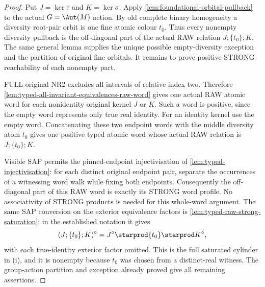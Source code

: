 \begin{proof}
Put $J=\ker\tau$ and $K=\ker\sigma$. Apply
\cref{lem:foundational-orbital-pullback} to the actual
$G=\Aut(M)$ action. By old complete binary homogeneity a diversity
root-pair orbit is one fine atomic colour $t_0$. Thus every nonempty
diversity pullback is the off-diagonal part of the actual RAW relation
$J;\{t_0\};K$. The same general lemma supplies the unique possible
empty-diversity exception and the partition of original fine orbitals.
It remains to prove positive STRONG reachability of each nonempty part.

FULL original NR2 excludes all intervals of relative index two.
Therefore \cref{lem:typed-all-invariant-equivalences-raw-word}
gives one actual RAW atomic word for each nonidentity original kernel
$J$ or $K$. Such a word is positive, since the empty word represents
only true real identity. For an identity kernel use the empty word.
Concatenating these two endpoint words with the middle diversity atom
$t_0$ gives one positive typed atomic word whose actual RAW relation
is $J;\{t_0\};K$.

Visible SAP permits the pinned-endpoint injectivisation of
\cref{lem:typed-injectivisation}: for each distinct original endpoint
pair, separate the occurrences of a witnessing word walk while fixing
both endpoints. Consequently the off-diagonal part of this RAW word
is exactly its STRONG word profile. No associativity of STRONG
products is needed for this whole-word argument.
The same SAP conversion on the exterior equivalence factors is
\cref{lem:typed-raw-strong-saturation}; in the established notation it gives
\[
 (J;\{t_0\};K)^\circ
       =J^\circ\starprod\{t_0\}\starprod K^\circ,
\]
with each true-identity exterior factor omitted. This is the full
saturated cylinder in (i), and it is nonempty because $t_0$ was chosen
from a distinct-real witness. The group-action partition and exception
already proved give all remaining assertions.
\end{proof}

